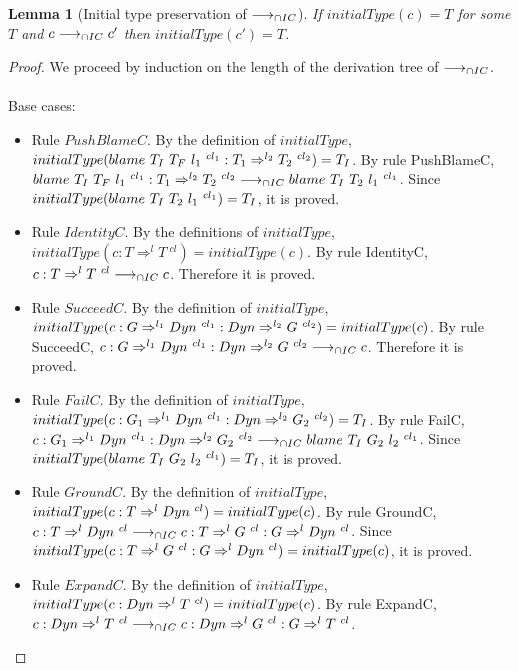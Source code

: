 \documentclass[a4paper]{article}
\newtheorem{lemma}{Lemma}
\begin{document}
\begin{lemma}[Initial type preservation of $\longrightarrow_{\cap IC}$]
\label{initialtypepreservationIC}
If $initialType(c) = T$ for some $T$ and $c \longrightarrow_{\cap IC} c'$ then $initialType(c') = T$.
\end{lemma}
\begin{proof}
We proceed by induction on the length of the derivation tree of $\longrightarrow_{\cap IC}$.\\\\
Base cases:
\begin{itemize}
    \item Rule $PushBlameC$.
    By the definition of $initialType$, $initialType(blame\ T_I\ T_F\ l_1\ ^{cl_1} : T_1 \Rightarrow^{l_2} T_2\ ^{cl_2}) = T_I$.
    By rule PushBlameC, $blame\ T_I\ T_F\ l_1\ ^{cl_1} : T_1 \Rightarrow^{l_2} T_2\ ^{cl_2} \longrightarrow_{\cap IC} blame\ T_I\ T_2\ l_1\ ^{cl_1}$.
    Since $initialType(blame\ T_I\ T_2\ l_1\ ^{cl_1}) = T_I$, it is proved.
    \item Rule $IdentityC$.
    By the definitions of $initialType$, $initialType(c : T \Rightarrow^l T\ ^{cl}) = initialType(c)$.
    By rule IdentityC, $c : T \Rightarrow^l T\ ^{cl} \icos c$.
    Therefore it is proved.
    \item Rule $SucceedC$.
    By the definition of $initialType$, $initialType(c : G \Rightarrow^{l_1} \Dyn\ ^{cl_1} : \Dyn \Rightarrow^{l_2} G\ ^{cl_2}) = initialType(c)$.
    By rule SucceedC, $c : G \Rightarrow^{l_1} Dyn\ ^{cl_1} : Dyn \Rightarrow^{l_2} G\ ^{cl_2} \longrightarrow_{\cap IC} c$.
    Therefore it is proved.
    \item Rule $FailC$.
    By the definition of $initialType$, $initialType(c : G_1 \Rightarrow^{l_1} \Dyn\ ^{cl_1} : \Dyn \Rightarrow^{l_2} G_2\ ^{cl_2}) = T_I$.
    By rule FailC, $c : G_1 \Rightarrow^{l_1} \Dyn\ ^{cl_1} : \Dyn \Rightarrow^{l_2} G_2\ ^{cl_2} \icos \blamecast{T_I}{G_2}{l_2}{cl_1}$.
    Since $initialType(blame\ T_I\ G_2\ l_2\ ^{cl_1}) = T_I$, it is proved.
    \item Rule $GroundC$.
    By the definition of $initialType$, $initialType(c : T \Rightarrow^l Dyn\ ^{cl}) = initialType(c)$.
    By rule GroundC, $c : T \Rightarrow^l Dyn\ ^{cl} \longrightarrow_{\cap IC} c : T \Rightarrow^l G\ ^{cl} : G \Rightarrow^l Dyn\ ^{cl}$.
    Since $initialType(c : T \Rightarrow^l G\ ^{cl} : G \Rightarrow^l Dyn\ ^{cl}) = initialType(c)$, it is proved.
    \item Rule $ExpandC$.
    By the definition of $initialType$, $initialType(c : Dyn \Rightarrow^l T\ ^{cl}) = initialType(c)$.
    By rule ExpandC, $c : Dyn \Rightarrow^l T\ ^{cl} \longrightarrow_{\cap IC} c : Dyn \Rightarrow^l G\ ^{cl} : G \Rightarrow^l T\ ^{cl}$.

\end{itemize}
\end{proof}
\end{document}
